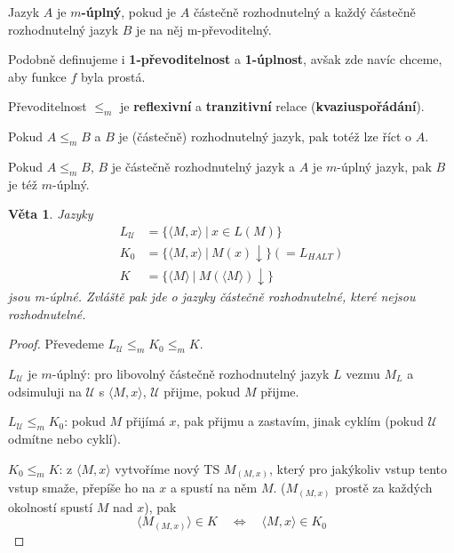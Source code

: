 \documentclass[11pt]{report} %
\newtheorem{theorem}{Věta}[section]
\numberwithin{equation}{section}
\begin{document}
Jazyk $A$ je \textbf{$m$-úplný}, pokud je $A$ částečně rozhodnutelný a každý částečně rozhodnutelný jazyk $B$ je na něj m-převoditelný.

Podobně definujeme i \textbf{1-převoditelnost} a \textbf{1-úplnost}, avšak zde navíc chceme, aby funkce $f$ byla prostá.

Převoditelnost $\leq_m$ je \textbf{reflexivní} a \textbf{tranzitivní} relace (\textbf{kvaziuspořádání}).

Pokud $A \leq_m B$ a $B$ je (částečně) rozhodnutelný jazyk, pak totéž lze říct o $A$.

Pokud $A \leq_m B$, $B$ je částečně rozhodnutelný jazyk a $A$ je $m$-úplný jazyk, pak $B$ je též $m$-úplný.

\begin{theorem}
Jazyky
\begin{align*}
L_\mathcal{U} &= \{\langle M,x\rangle\ |\  x \in L(M)\}\\
K_0 &= \{\langle M,x\rangle\ |\  M(x){\downarrow}\} (= L_{HALT})\\
K &= \{\langle M\rangle\ |\ M(\langle M\rangle){\downarrow}\}
\end{align*} 
jsou m-úplné. Zvláště pak jde o jazyky částečně rozhodnutelné, které nejsou rozhodnutelné.
\end{theorem}
\begin{proof}
Převedeme $L_\mathcal{U} \leq_m K_0 \leq_m K$.

$L_\mathcal{U}$ je $m$-úplný: pro libovolný částečně rozhodnutelný jazyk $L$ vezmu $M_L$ a odsimuluji na $\mathcal{U}$ s $\langle M,x \rangle$, $\mathcal{U}$ přijme, pokud $M$ přijme.

$L_\mathcal{U} \leq_m K_0$: pokud $M$ přijímá $x$, pak přijmu a zastavím, jinak cyklím (pokud $\mathcal{U}$ odmítne nebo cyklí).

$K_0 \leq_m K$: z $\langle M,x \rangle$ vytvoříme nový TS $M_{(M,x)}$, který pro jakýkoliv vstup tento vstup smaže, přepíše ho na $x$ a spustí na něm $M$. ($M_{(M,x)}$ prostě za každých okolností spustí $M$ nad $x$), pak
$$\langle M_{(M,x)}\rangle \in K \quad \Leftrightarrow \quad \langle M,x\rangle \in K_0$$
	
\end{proof}
\end{document}
